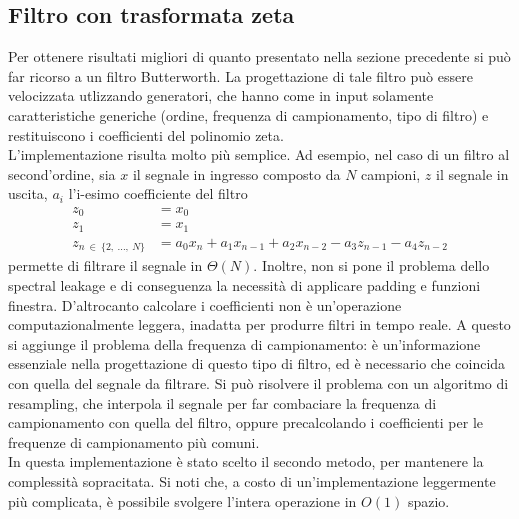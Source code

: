 \subsection{Filtro con trasformata zeta}
Per ottenere risultati migliori di quanto presentato nella sezione precedente si può far ricorso a un filtro Butterworth.
La progettazione di tale filtro può essere velocizzata utlizzando generatori, che hanno come in input solamente caratteristiche generiche
(ordine, frequenza di campionamento, tipo di filtro) e restituiscono i coefficienti del polinomio zeta.\\
L'implementazione risulta molto più semplice. Ad esempio, nel caso di un filtro al second'ordine, sia $x$ il segnale in ingresso composto da $N$ campioni, $z$ il segnale in uscita, $a_i$ l'i-esimo coefficiente del filtro
\begin{align*}
z_0 &= x_0\\
z_1 &= x_1\\
z_{n \ \in \ \{2, \ \dots, \ N\}} &= a_0x_n + a_1x_{n-1} + a_2x_{n-2} - a_3z_{n-1} - a_4z_{n-2} 
\end{align*}
permette di filtrare il segnale in $\Theta(N)$. Inoltre, non si pone il problema dello spectral leakage e di conseguenza la necessità di applicare padding e funzioni finestra.
D'altrocanto calcolare i coefficienti non è un'operazione computazionalmente leggera, inadatta per produrre filtri in tempo reale.
A questo si aggiunge il problema della frequenza di campionamento: è un'informazione essenziale nella progettazione di questo tipo di filtro, ed è necessario che coincida con quella del segnale da filtrare.
Si può risolvere il problema con un algoritmo di resampling, che interpola il segnale per far combaciare la frequenza di campionamento con quella del filtro, oppure precalcolando i coefficienti per le frequenze di campionamento più comuni.\\
In questa implementazione è stato scelto il secondo metodo, per mantenere la complessità sopracitata. Si noti che, a costo di un'implementazione leggermente più complicata, è possibile svolgere l'intera operazione in $O(1)$ spazio.

